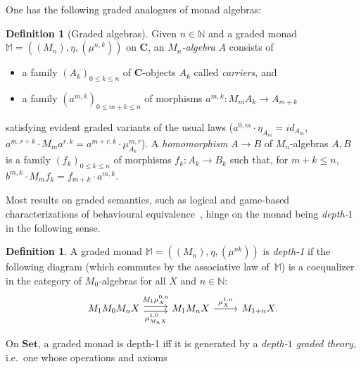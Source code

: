 \documentclass[a4paper,UKenglish,cleveref,thm-restate,numberwithinsect,final]{lipics-v2021}
\theoremstyle{plain}
\newcommand{\id}{\mathit{id}}
\numberwithin{equation}{section}
\newcommand{\Nat}{{\mathbb{N}}}
\newcommand{\monad}{{\mathbb{M}}}
\newcommand{\Set}{\mathbf{Set}}
\newcommand{\+}[1]{\mathcal{#1}\xspace}
\newcommand{\BC}{\mathbf{C}}
\theoremstyle{definition}
\newtheorem{defn}[theorem]{Definition}
\begin{document}
\noindent One has the following graded analogues of monad algebras:
\begin{defn}[Graded algebras]
  Given \(n \in \Nat\) and a graded monad
  \(\monad=((M_n), \eta, (\mu^{n, k}))\) on \(\BC\), an
  \emph{\(M_n\)-algebra} \(A\) consists of
    \begin{itemize}
        \item a family \((A_k)_{0 \le k \le n}\) of $\BC$-objects \(A_k\) called \emph{carriers}, and
        \item a family \((a^{m, k})_{0 \le m + k \le n}\) of morphisms \(a^{m, k}: M_m A_k \to A_{m + k}\)
    \end{itemize}
    satisfying evident graded variants of the usual laws
    (\(a^{0, m} \cdot \eta_{A_m} = \id_{A_m}\),
    \(a^{m, r + k} \cdot M_m a^{r, k} = a^{m + r, k} \cdot \mu^{m,
      r}_{A_k}\)).
    A \emph{homomorphism} $A\to B$ of \(M_n\)-algebras \(A, B\) is a
    family \((f_k)_{0 \le k \le n}\) of morphisms
    \(f_k\colon A_k \to B_k\) such that, for \(m + k \le n\),
    \(b^{m, k} \cdot M_m f_k = f_{m + k} \cdot a^{m, k}\).
\end{defn}
\noindent Most results on graded semantics, such as logical and
game-based characterizations of behavioural
equivalence~\cite{MiliusEA15,DorschEA19,FordEA22,ForsterEA25a,ForsterEA25b},
hinge on the monad being \emph{depth-$1$} in the following sense.
\begin{defn}\label{def:depth-1}
  A graded monad \(\monad=((M_n), \eta, (\mu^{nk}))\) is
  \emph{depth-1} if the following diagram (which commutes by the
  associative law of~$\monad$) is a coequalizer in the category of
  \(M_0\)-algebras for all \(X\) and \(n \in \Nat\):
  \begin{equation}
    \label{eq:depth-1}
    \begin{tikzcd}
      M_1 M_0 M_n X    \arrow[r,swap, "\mu^{1,0}_{M_n X }", shift right] \arrow[r, "M_1 \mu^{0,n}_X ", shift left] & M_1 M_n X   \arrow[r, "\mu^{1,n}_X"] & M_{1+n} X .
    \end{tikzcd}
  \end{equation}
\end{defn}
\noindent
On \(\Set\), a graded monad is depth-1 iff it is generated by a
\emph{depth-$1$ graded theory}, i.e.\ one whose operations and axioms
\end{document}
